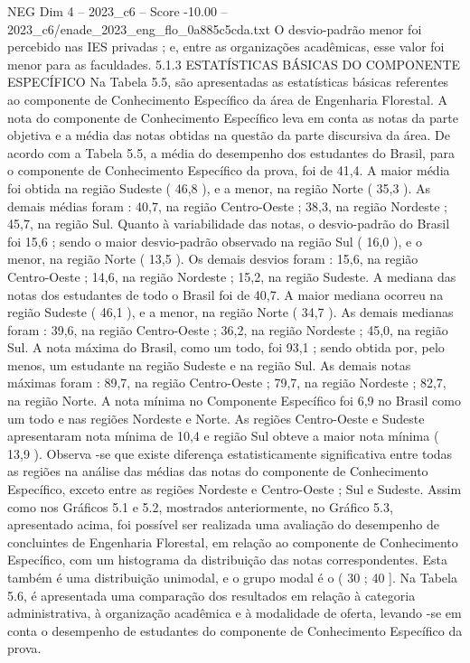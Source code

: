 \begin{textsample}{NEG Dim 4 – 2023\_c6 – Score -10.00 – 2023\_c6/enade\_2023\_eng\_flo\_0a885c5cda.txt}
O desvio-padrão menor foi percebido nas IES privadas ; e, entre as organizações acadêmicas, esse valor foi menor para as faculdades. 5.1.3 ESTATÍSTICAS BÁSICAS DO COMPONENTE ESPECÍFICO Na Tabela 5.5, são apresentadas as estatísticas básicas referentes ao componente de Conhecimento Específico da área de Engenharia Florestal.
A nota do componente de Conhecimento Específico leva em conta as notas da parte objetiva e a média das notas obtidas na questão da parte discursiva da área.
De acordo com a Tabela 5.5, a média do desempenho dos estudantes do Brasil, para o componente de Conhecimento Específico da prova, foi de 41,4.
A maior média foi obtida na região Sudeste ( 46,8 ), e a menor, na região Norte ( 35,3 ).
As demais médias foram : 40,7, na região Centro-Oeste ; 38,3, na região Nordeste ; 45,7, na região Sul.
Quanto à variabilidade das notas, o desvio-padrão do Brasil foi 15,6 ; sendo o maior desvio-padrão observado na região Sul ( 16,0 ), e o menor, na região Norte ( 13,5 ).
Os demais desvios foram : 15,6, na região Centro-Oeste ; 14,6, na região Nordeste ; 15,2, na região Sudeste.
A mediana das notas dos estudantes de todo o Brasil foi de 40,7.
A maior mediana ocorreu na região Sudeste ( 46,1 ), e a menor, na região Norte ( 34,7 ).
As demais medianas foram : 39,6, na região Centro-Oeste ; 36,2, na região Nordeste ; 45,0, na região Sul.
A nota máxima do Brasil, como um todo, foi 93,1 ; sendo obtida por, pelo menos, um estudante na região Sudeste e na região Sul.
As demais notas máximas foram : 89,7, na região Centro-Oeste ; 79,7, na região Nordeste ; 82,7, na região Norte.
A nota mínima no Componente Específico foi 6,9 no Brasil como um todo e nas regiões Nordeste e Norte.
As regiões Centro-Oeste e Sudeste apresentaram nota mínima de 10,4 e região Sul obteve a maior nota mínima ( 13,9 ).
Observa -se que existe diferença estatisticamente significativa entre todas as regiões na análise das médias das notas do componente de Conhecimento Específico, exceto entre as regiões Nordeste e Centro-Oeste ; Sul e Sudeste.
Assim como nos Gráficos 5.1 e 5.2, mostrados anteriormente, no Gráfico 5.3, apresentado acima, foi possível ser realizada uma avaliação do desempenho de concluintes de Engenharia Florestal, em relação ao componente de Conhecimento Específico, com um histograma da distribuição das notas correspondentes.
Esta também é uma distribuição unimodal, e o grupo modal é o ( 30 ; 40 ].
Na Tabela 5.6, é apresentada uma comparação dos resultados em relação à categoria administrativa, à organização acadêmica e à modalidade de oferta, levando -se em conta o desempenho de estudantes do componente de Conhecimento Específico da prova.

\end{textsample}
